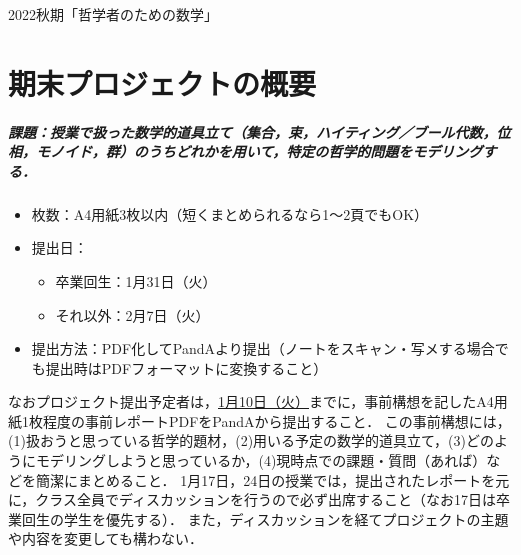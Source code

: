 \documentclass[11pt,a4paper]{jsarticle}
\begin{document}
\noindent
2022秋期「哲学者のための数学」

\section*{期末プロジェクトの概要}

\subparagraph{課題：授業で扱った数学的道具立て（集合，束，ハイティング／ブール代数，位相，モノイド，群）のうちどれかを用いて，特定の哲学的問題をモデリングする．}

\begin{itemize}
 \item 枚数：A4用紙3枚以内（短くまとめられるなら1〜2頁でもOK）
 \item 提出日：
\begin{itemize}
 \item 卒業回生：1月31日（火）
 \item それ以外：2月7日（火）
\end{itemize}
 \item 提出方法：PDF化してPandAより提出（ノートをスキャン・写メする場合でも提出時はPDFフォーマットに変換すること）
\end{itemize}


なおプロジェクト提出予定者は，\underline{1月10日（火）}までに，事前構想を記したA4用紙1枚程度の事前レポートPDFをPandAから提出すること．
この事前構想には，(1)扱おうと思っている哲学的題材，(2)用いる予定の数学的道具立て，(3)どのようにモデリングしようと思っているか，(4)現時点での課題・質問（あれば）などを簡潔にまとめること．
1月17日，24日の授業では，提出されたレポートを元に，クラス全員でディスカッションを行うので必ず出席すること（なお17日は卒業回生の学生を優先する）．
また，ディスカッションを経てプロジェクトの主題や内容を変更しても構わない．
\end{document}

